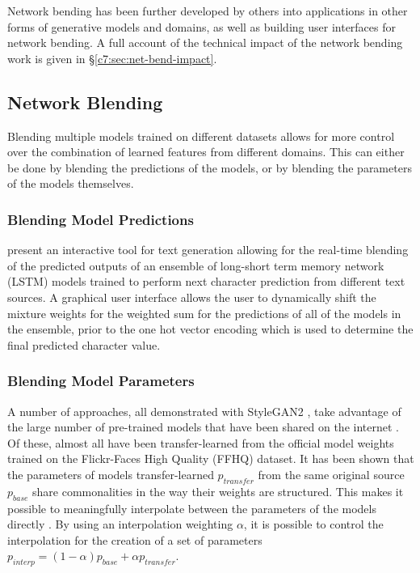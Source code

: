 Network bending has been further developed by others into applications in other forms of generative models and domains, as well as building user interfaces for network bending.
A full account of the technical impact of the network bending work is given in \S \ref{c7:sec:net-bend-impact}.

\subsection{Network Blending}
\label{survey:blending}

Blending multiple models trained on different datasets allows for more control over the combination of learned features from different domains. 
This can either be done by blending the predictions of the models, or by blending the parameters of the models themselves.

\subsubsection{Blending Model Predictions} 

\citet{akten2016real} present an interactive tool for text generation allowing for the real-time blending of the predicted outputs of an ensemble of long-short term memory network (LSTM) models \citep{hochreiter1997long} trained to perform next character prediction from different text sources. 
A graphical user interface allows the user to dynamically shift the mixture weights for the weighted sum for the predictions of all of the models in the ensemble, prior to the one hot vector encoding which is used to determine the final predicted character value.


\subsubsection{Blending Model Parameters} 
A number of approaches, all demonstrated with StyleGAN2 \citep{karras2019analyzing}, take advantage of the large number of pre-trained models that have been shared on the internet \citep{pinkney2020awesome}. 
Of these, almost all have been transfer-learned from the official model weights trained on the Flickr-Faces High Quality (FFHQ) dataset.
It has been shown that the parameters of models transfer-learned $p_{transfer}$ from the same original source $p_{base}$ share commonalities in the way their weights are structured. 
This makes it possible to meaningfully interpolate between the parameters of the models directly \citep{aydao2020interp}. 
By using an interpolation weighting $\alpha$, it is possible to control the interpolation for the creation of a set of parameters $p_{interp} = (1 - \alpha)p_{base} + \alpha p_{transfer}$. 


